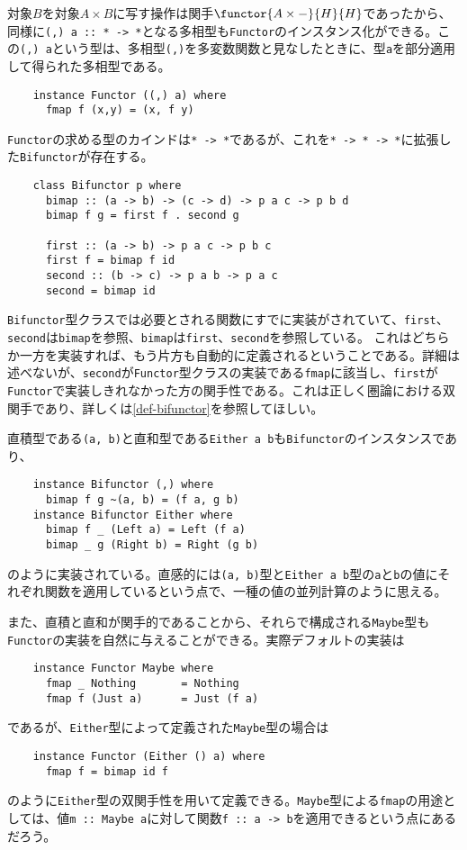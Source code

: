 \documentclass[uplatex,dvipdfmx]{jsarticle}
\newcommand{\pr}[1]{\colorbox[rgb]{0.9,0.9,0.9}{\lstinline{#1}}}
\newcommand{\refcti}[1]{\cite{cti}\ref{#1}}
\begin{document}
  対象$B$を対象$A\times B$に写す操作は関手$\functor{A \times -}{H}{H}$であったから、同様に\pr{(,) a :: * -> *}となる多相型も\pr{Functor}のインスタンス化ができる。この\pr{(,) a}という型は、多相型\pr{(,)}を多変数関数と見なしたときに、型\pr{a}を部分適用して得られた多相型である。
  \begin{lstlisting}
    instance Functor ((,) a) where
      fmap f (x,y) = (x, f y)
  \end{lstlisting}
  \pr{Functor}の求める型のカインドは\pr{* -> *}であるが、これを\pr{* -> * -> *}に拡張した\pr{Bifunctor}が存在する。
  \begin{lstlisting}
    class Bifunctor p where
      bimap :: (a -> b) -> (c -> d) -> p a c -> p b d
      bimap f g = first f . second g

      first :: (a -> b) -> p a c -> p b c
      first f = bimap f id
      second :: (b -> c) -> p a b -> p a c
      second = bimap id
  \end{lstlisting}
  \pr{Bifunctor}型クラスでは必要とされる関数にすでに実装がされていて、\pr{first}、\pr{second}は\pr{bimap}を参照、\pr{bimap}は\pr{first}、\pr{second}を参照している。
  これはどちらか一方を実装すれば、もう片方も自動的に定義されるということである。詳細は述べないが、\pr{second}が\pr{Functor}型クラスの実装である\pr{fmap}に該当し、\pr{first}が\pr{Functor}で実装しきれなかった方の関手性である。これは正しく圏論における双関手であり、詳しくは\refcti{def-bifunctor}を参照してほしい。
  
  直積型である\pr{(a, b)}と直和型である\pr{Either a b}も\pr{Bifunctor}のインスタンスであり、
  \begin{lstlisting}
    instance Bifunctor (,) where
      bimap f g ~(a, b) = (f a, g b)
    instance Bifunctor Either where
      bimap f _ (Left a) = Left (f a)
      bimap _ g (Right b) = Right (g b)
  \end{lstlisting}
  のように実装されている。直感的には\pr{(a, b)}型と\pr{Either a b}型の\pr{a}と\pr{b}の値にそれぞれ関数を適用しているという点で、一種の値の並列計算のように思える。

  また、直積と直和が関手的であることから、それらで構成される\pr{Maybe}型も\pr{Functor}の実装を自然に与えることができる。実際デフォルトの実装は
  \begin{lstlisting}
    instance Functor Maybe where
      fmap _ Nothing       = Nothing
      fmap f (Just a)      = Just (f a)
  \end{lstlisting}
  であるが、\pr{Either}型によって定義された\pr{Maybe}型の場合は
  \begin{lstlisting}
    instance Functor (Either () a) where
      fmap f = bimap id f
  \end{lstlisting}
  のように\pr{Either}型の双関手性を用いて定義できる。\pr{Maybe}型による\pr{fmap}の用途としては、値\pr{m :: Maybe a}に対して関数\pr{f :: a -> b}を適用できるという点にあるだろう。
  
\end{document}
